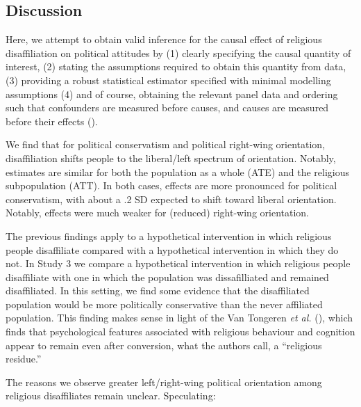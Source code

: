\documentclass[
  singlecolumn]{article}
\begin{document}
\subsection{Discussion}\label{discussion}

Here, we attempt to obtain valid inference for the causal effect of
religious disaffiliation on political attitudes by (1) clearly
specifying the causal quantity of interest, (2) stating the assumptions
required to obtain this quantity from data, (3) providing a robust
statistical estimator specified with minimal modelling assumptions (4)
and of course, obtaining the relevant panel data and ordering such that
confounders are measured before causes, and causes are measured before
their effects ().

We find that for political conservatism and political right-wing
orientation, disaffiliation shifts people to the liberal/left spectrum
of orientation. Notably, estimates are similar for both the population
as a whole (ATE) and the religious subpopulation (ATT). In both cases,
effects are more pronounced for political conservatism, with about a .2
SD expected to shift toward liberal orientation. Notably, effects were
much weaker for (reduced) right-wing orientation.

The previous findings apply to a hypothetical intervention in which
religious people disaffiliate compared with a hypothetical intervention
in which they do not. In Study 3 we compare a hypothetical intervention
in which religious people disaffiliate with one in which the population
was dissafilliated and remained disaffiliated. In this setting, we find
some evidence that the disaffiliated population would be more
politically conservative than the never affiliated population. This
finding makes sense in light of the Van Tongeren \emph{et al.}
(), which finds that psychological
features associated with religious behaviour and cognition appear to
remain even after conversion, what the authors call, a ``religious
residue.''

The reasons we observe greater left/right-wing political orientation
among religious disaffiliates remain unclear. Speculating:
\end{document}
